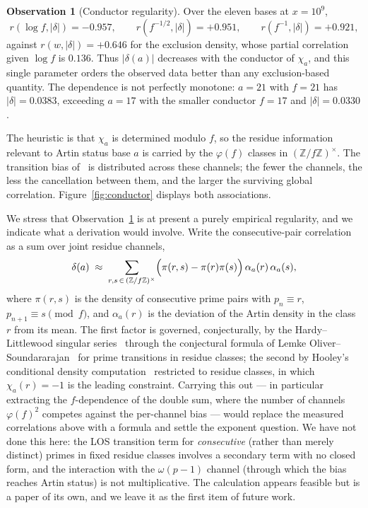 \documentclass[11pt,reqno]{amsart}
\theoremstyle{plain}
\theoremstyle{definition}
\newtheorem{observation}[theorem]{Observation}
\newcommand{\Z}{\mathbb{Z}}
\begin{document}
\begin{observation}[Conductor regularity]
\label{obs:conductor}
Over the eleven bases at $x = 10^9$,
\[
  r(\log f, |\delta|) = -0.957, \qquad
  r(f^{-1/2}, |\delta|) = +0.951, \qquad
  r(f^{-1}, |\delta|) = +0.921,
\]
against $r(w, |\delta|) = +0.646$ for the exclusion density, whose partial
correlation given $\log f$ is $0.136$. Thus $|\delta(a)|$ decreases with the
conductor of $\chi_a$, and this single parameter orders the observed data
better than any exclusion-based quantity. The dependence is not perfectly
monotone: $a = 21$ with $f = 21$ has $|\delta| = 0.0383$, exceeding $a = 17$
with the smaller conductor $f = 17$ and $|\delta| = 0.0330$.
\end{observation}

The heuristic is that $\chi_a$ is determined modulo $f$, so the residue
information relevant to Artin status base $a$ is carried by the
$\varphi(f)$ classes in $(\Z/f\Z)^\times$. The transition bias
of~\cite{LOS2016} is distributed across these channels; the fewer the channels,
the less the cancellation between them, and the larger the surviving global
correlation. Figure~\ref{fig:conductor} displays both associations.

We stress that Observation~\ref{obs:conductor} is at present a purely empirical
regularity, and we indicate what a derivation would involve. Write the
consecutive-pair correlation as a sum over joint residue channels,
\[
  \delta(a) \;\approx\; \sum_{r, s \,\in\, (\Z/f\Z)^\times}
     \Bigl( \pi(r, s) - \pi(r)\pi(s) \Bigr)\,
     \alpha_a(r)\,\alpha_a(s),
\]
where $\pi(r, s)$ is the density of consecutive prime pairs with
$p_n \equiv r$, $p_{n+1} \equiv s \pmod f$, and $\alpha_a(r)$ is the deviation
of the Artin density in the class $r$ from its mean. The first factor is
governed, conjecturally, by the Hardy--Littlewood singular
series~\cite{HardyLittlewood1923} through the conjectural formula of Lemke
Oliver--Soundararajan~\cite[Conj.~1.1]{LOS2016} for prime transitions in
residue classes; the second by Hooley's conditional density
computation~\cite{Hooley1967} restricted to residue classes, in which
$\chi_a(r) = -1$ is the leading constraint. Carrying this out --- in particular
extracting the $f$-dependence of the double sum, where the number of channels
$\varphi(f)^2$ competes against the per-channel bias --- would replace the
measured correlations above with a formula and settle the exponent question.
We have not done this here: the LOS transition term for \emph{consecutive}
(rather than merely distinct) primes in fixed residue classes involves a
secondary term with no closed form, and the interaction with the
$\omega(p-1)$ channel (through which the bias reaches Artin status) is not
multiplicative. The calculation appears feasible but is a paper of its own,
and we leave it as the first item of future work.
\end{document}
